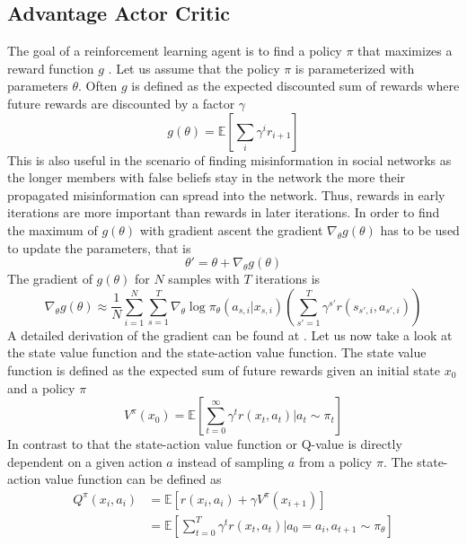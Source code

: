\documentclass[11pt, a4paper]{article}
\begin{document}
\subsection{Advantage Actor Critic}
The goal of a reinforcement learning agent is to find a policy $\pi$ that maximizes a reward function $g$ \cite{A2C_2}. Let us assume that the policy $\pi$ is parameterized with parameters $\theta$. Often $g$ is defined as the expected discounted sum of rewards where future rewards are discounted by a factor $\gamma$
%
\begin{equation}
	g(\theta) = \mathbb{E}[\sum_{i}^{} \gamma^i r_{i+1}]
\end{equation}
%
This is also useful in the scenario of finding misinformation in social networks as the longer members with false beliefs stay in the network the more their propagated misinformation can spread into the network. Thus, rewards in early iterations are more important than rewards in later iterations.\newline
In order to find the maximum of $g(\theta)$ with gradient ascent the gradient $\nabla_\theta g(\theta)$ has to be used to update the parameters, that is
\begin{equation}
\theta' = \theta + \nabla_\theta g(\theta)
\end{equation}
The gradient of $g(\theta)$ for $N$ samples with $T$ iterations is 
\begin{equation} \label{equ:pol_grad}
	\nabla_\theta g(\theta) \approx \frac{1}{N} \sum_{i=1}^{N}\sum_{s=1}^{T}\nabla_\theta \log \pi_\theta(a_{s,i}|x_{s,i}) \left(\sum_{s'=1}^{T}\gamma^{s'} r(s_{s',i},a_{s',i})\right)
\end{equation}
A detailed derivation of the gradient can be found at \cite{pol_grad2, pol_grad1}. Let us now take a look at the state value function and the state-action value function.
The state value function is defined as the expected sum of future rewards given an initial state $x_0$ and a policy $\pi$
%
\begin{equation}
	V^{\pi}(x_0)=\mathbb{E}[\sum_{t=0}^{\infty}\gamma^tr(x_t,a_t)|a_t\sim\pi_t]
\end{equation}
%
In contrast to that the state-action value function or Q-value is directly dependent on a given action $a$ instead of sampling $a$ from a policy $\pi$. The state-action value function can be defined as 
%
\begin{equation}
\begin{split}
	Q^\pi(x_i,a_i) 
		& =\mathbb{E}[r(x_i,a_i)+\gamma V^{\pi}(x_{i+1})] \\
		& =\mathbb{E}[\sum_{t=0}^{T} \gamma^t r(x_t,a_t)| a_0=a_i, a_{t+1} \sim \pi_{\theta}]
\end{split}
\end{equation}
\end{document}
